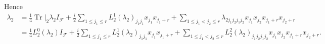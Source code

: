 \documentclass[aps, preprint]{revtex4}
\begin{document}
Hence
\begin{align}\lambda _{2} &  =\frac{1}{4} \left .\ensuremath{\operatorname*{Tr}}\right \vert _{2} \lambda _{2} I_{\mathcal{F}} +\frac{i}{2} \sum _{1 \leq j_{1} \leq r}L_{2}^{1} \left (\lambda _{2}\right )_{j_{1} j_{1}} x_{j_{1}} x_{j_{1} +r} +\sum _{1 \leq j_{1} <j_{2} \leq r}\lambda _{2 j_{1} j_{2} j_{1} j_{2}} x_{j_{1}} x_{j_{2}} x_{j_{1} +r} x_{j_{2} +r} \nonumber  \\
 &  =\frac{1}{4} L_{2}^{0} \left (\lambda _{2}\right ) I_{\mathcal{F}} +\frac{i}{2} \sum _{1 \leq j_{1} \leq r}L_{2}^{1} \left (\lambda _{2}\right )_{j_{1} j_{1}} x_{j_{1}} x_{j_{1} +r} +\sum _{1 \leq j_{1} <j_{2} \leq r}L_{2}^{2} \left (\lambda _{2}\right )_{j_{1} j_{2} j_{1} j_{2}} x_{j_{1}} x_{j_{2}} x_{j_{1} +r} x_{j_{2} +r}\text{.}\end{align}
\end{document}
